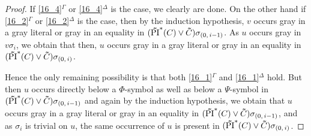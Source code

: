 \documentclass[%
	draft=false,%
	numbers=noendperiod,%
	11pt,%
	a4paper,%
	oneside,%
	openany,%
]{memoir}
\begin{document}
\begin{proof}
	If \ref{16_4}$^\Gamma$ or \ref{16_4}$^\Delta$ is the case, we clearly are done.
	On the other hand if \ref{16_2}$^\Gamma$ or \ref{16_2}$^\Delta$ is the case, then by the induction hypothesis, $v$ occurs gray in a gray literal or gray in an equality in $(\bm\tilde{\operatorname{PI}}^{*}(C)\lor \bm\tilde{C})\sigma_{(0,\,i-1)}$. 
	As $u$ occurs gray in $v\sigma_i$, we obtain that then, $u$ occurs gray in a gray literal or gray in an equality in $(\bm\tilde{\operatorname{PI}}^{*}(C)\lor \bm\tilde{C})\sigma_{(0,\,i)}$.

	Hence the only remaining possibility is that both \ref{16_1}$^\Gamma$
	and \ref{16_1}$^\Delta$ hold.
	But then $u$ occurs directly below a $\Phi$-symbol as well as below a $\Psi$-symbol in $(\bm\tilde{\operatorname{PI}}^{*}(C)\lor \bm\tilde{C})\sigma_{(0,\,i-1)}$ and again by the induction hypothesis, we obtain that $u$ occurs gray in a gray literal or gray in an equality in $(\bm\tilde{\operatorname{PI}}^{*}(C)\lor \bm\tilde{C})\sigma_{(0,\,i-1)}$, and as $\sigma_i$ is trivial on $u$, the same occurrence of $u$ is present in $(\bm\tilde{\operatorname{PI}}^{*}(C)\lor \bm\tilde{C})\sigma_{(0,\,i)}$.
\end{proof}
\end{document}
